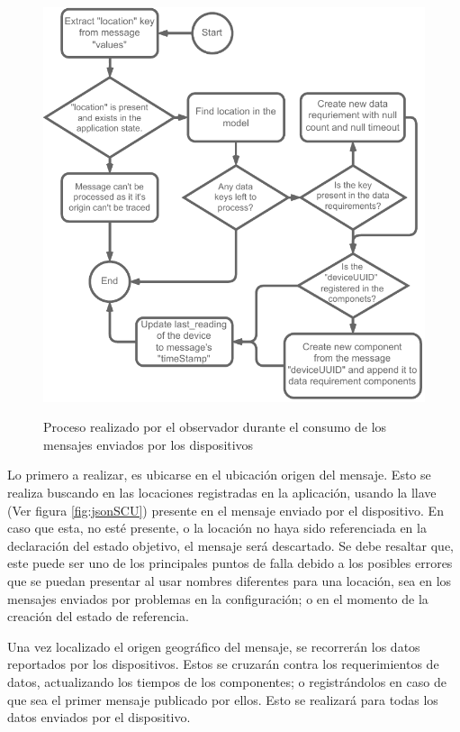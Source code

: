 \begin{figure}[ht]
    \centering
    \caption{Proceso realizado por el observador durante el consumo de los mensajes enviados por los dispositivos} 
    \includegraphics[width=0.85\linewidth]{images/LookerProcessUpdateState.pdf}
    \label{fig:LookerProcessUpdateState}
\end{figure} 

Lo primero a realizar, es ubicarse en el ubicación origen del mensaje. Esto se realiza buscando en las locaciones registradas en la aplicación, usando la llave (Ver figura \ref{fig:jsonSCU}) presente en el mensaje enviado por el dispositivo. En caso que esta, no esté presente, o la locación no haya sido referenciada en la declaración del estado objetivo, el mensaje será descartado. Se debe resaltar que, este puede ser uno de los principales puntos de falla debido a los posibles errores que se puedan presentar al usar nombres diferentes para una locación, sea en los mensajes enviados por problemas en la configuración; o en el momento de la creación del estado de referencia. 

Una vez localizado el origen geográfico del mensaje, se recorrerán los datos reportados por los dispositivos. Estos se cruzarán contra los requerimientos de datos, actualizando los tiempos de los componentes; o registrándolos en caso de que sea el primer mensaje publicado por ellos. Esto se realizará para todas los datos enviados por el dispositivo.
 
